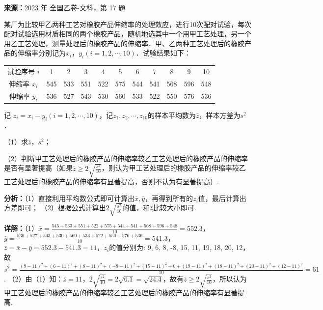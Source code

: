 \begin{question}[points=12]
\textbf{来源：}2023 年 全国乙卷-文科，第 17 题\par
某厂为比较甲乙两种工艺对橡胶产品伸缩率的处理效应，进行10次配对试验，每次配对试验选用材质相同的两个橡胶产品，随机地选其中一个用甲工艺处理，另一个用乙工艺处理，测量处理后的橡胶产品的伸缩率．甲、乙两种工艺处理后的橡胶产品的伸缩率分别记为$x_i$，$y_i (i=1,2,\cdots,10)$．试验结果如下：



\begin{center}

\begin{tabular}{ccccccccccc}

试验序号 $i$ & 1 & 2 & 3 & 4 & 5 & 6 & 7 & 8 & 9 & 10 \\

伸缩率 $x_i$ & 545 & 533 & 551 & 522 & 575 & 544 & 541 & 568 & 596 & 548 \\

伸缩率 $y_i$ & 536 & 527 & 543 & 530 & 560 & 533 & 522 & 550 & 576 & 536

\end{tabular}

\end{center}

记 $z_i=x_i-y_i (i=1,2,\cdots,10)$，记$z_1,z_2,\cdots,z_{10}$的样本平均数为$\bar{z}$，样本方差为$s^2$．

（1）求$\bar{z}$，$s^2$；

（2）判断甲工艺处理后的橡胶产品的伸缩率较乙工艺处理后的橡胶产品的伸缩率是否有显著提高（如果$\bar{z}\ge 2\sqrt{\frac{s^2}{10}}$，则认为甲工艺处理后的橡胶产品的伸缩率较乙工艺处理后的橡胶产品的伸缩率有显著提高，否则不认为有显著提高）.
\begin{solution}

\textbf{分析：}（1）直接利用平均数公式即可计算出$\bar{x},\bar{y}$，再得到所有的$z_i$值，最后计算出方差即可；
（2）根据公式计算出$2\sqrt{\frac{s^2}{10}}$的值，和$\bar{z}$比较大小即可.

\textbf{详解：}（1）$\bar{x}=\frac{545+533+551+522+575+544+541+568+596+548}{10}=552.3$，$\bar{y}=\frac{536+527+543+530+560+533+522+550+576+536}{10}=541.3$，$\bar{z}=\bar{x}-\bar{y}=552.3-541.3=11$，$z_i$的值分别为: 9, 6, 8, -8, 15, 11, 19, 18, 20, 12，故$s^2=\frac{(9-11)^2+(6-11)^2+(8-11)^2+(-8-11)^2+(15-11)^2+0+(19-11)^2+(18-11)^2+(20-11)^2+(12-11)^2}{10}=61$.
（2）由（1）知：$\bar{z}=11$，$2\sqrt{\frac{s^2}{10}}=2\sqrt{6.1}=\sqrt{24.4}$，故有$\bar{z}\ge2\sqrt{\frac{s^2}{10}}$，所以认为甲工艺处理后的橡胶产品的伸缩率较乙工艺处理后的橡胶产品的伸缩率有显著提高.
\end{solution}
\end{question}

